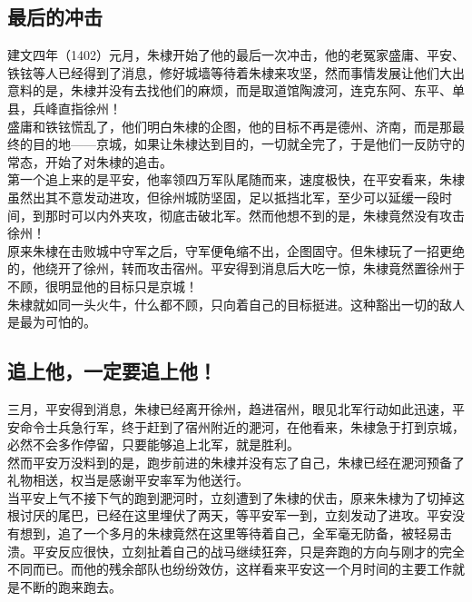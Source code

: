 \begin{multicols}{\theparacolNo}
\subsection{最后的冲击}
建文四年（1402）元月，朱棣开始了他的最后一次冲击，他的老冤家盛庸、平安、铁铉等人已经得到了消息，修好城墙等待着朱棣来攻坚，然而事情发展让他们大出意料的是，朱棣并没有去找他们的麻烦，而是取道馆陶渡河，连克东阿、东平、单县，兵峰直指徐州！\\

盛庸和铁铉慌乱了，他们明白朱棣的企图，他的目标不再是德州、济南，而是那最终的目的地——京城，如果让朱棣达到目的，一切就全完了，于是他们一反防守的常态，开始了对朱棣的追击。\\

第一个追上来的是平安，他率领四万军队尾随而来，速度极快，在平安看来，朱棣虽然出其不意发动进攻，但徐州城防坚固，足以抵挡北军，至少可以延缓一段时间，到那时可以内外夹攻，彻底击破北军。然而他想不到的是，朱棣竟然没有攻击徐州！\\

原来朱棣在击败城中守军之后，守军便龟缩不出，企图固守。但朱棣玩了一招更绝的，他绕开了徐州，转而攻击宿州。平安得到消息后大吃一惊，朱棣竟然置徐州于不顾，很明显他的目标只是京城！\\

朱棣就如同一头火牛，什么都不顾，只向着自己的目标挺进。这种豁出一切的敌人是最为可怕的。\\

\subsection{追上他，一定要追上他！}
三月，平安得到消息，朱棣已经离开徐州，趋进宿州，眼见北军行动如此迅速，平安命令士兵急行军，终于赶到了宿州附近的淝河，在他看来，朱棣急于打到京城，必然不会多作停留，只要能够追上北军，就是胜利。\\

然而平安万没料到的是，跑步前进的朱棣并没有忘了自己，朱棣已经在淝河预备了礼物相送，权当是感谢平安率军为他送行。\\

当平安上气不接下气的跑到淝河时，立刻遭到了朱棣的伏击，原来朱棣为了切掉这根讨厌的尾巴，已经在这里埋伏了两天，等平安军一到，立刻发动了进攻。平安没有想到，追了一个多月的朱棣竟然在这里等待着自己，全军毫无防备，被轻易击溃。平安反应很快，立刻扯着自己的战马继续狂奔，只是奔跑的方向与刚才的完全不同而已。而他的残余部队也纷纷效仿，这样看来平安这一个月时间的主要工作就是不断的跑来跑去。\\


\end{multicols}
